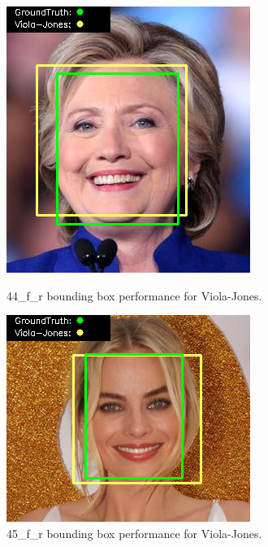 \documentclass{l4proj}
\begin{document}
\begin{appendices}
\begin{figure}[h!]
  \centering
  \begin{minipage}{0.49\textwidth}
    \centering
     \includegraphics[width=\textwidth]{images/appendix/viola/44.png}
    \caption{44\_f\_r bounding box performance for Viola-Jones.}
    \label{whoopi_result}
  \end{minipage}
    \hfill
    \begin{minipage}{0.49\textwidth}
    \centering
     \includegraphics[width=\textwidth]{images/appendix/viola/45.png}
    \caption{45\_f\_r bounding box performance for Viola-Jones.}
    \label{whoopi_result}
  \end{minipage}
\end{figure}


\end{appendices}
\end{document}
